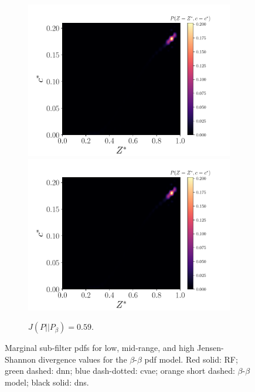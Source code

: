 \documentclass[review]{elsarticle}
\begin{document}
\begin{figure}[!tbp]
\begin{subfigure}[t]{0.32\textwidth}
    \includegraphics[page=3,width=\textwidth]{./figs/pdfs_14523.pdf}\\%
    \includegraphics[page=4,width=\textwidth]{./figs/pdfs_14523.pdf}%
    \caption{$J(P||P_{\beta})=0.59$.}\label{fig:}%
  \end{subfigure}%
  \caption{Marginal sub-filter \glspl{pdf} for low, mid-range, and high Jensen-Shannon divergence values for the $\beta$-$\beta$ \gls{pdf} model. Red solid: RF; green dashed: \gls{dnn}; blue dash-dotted: \gls{cvae}; orange short dashed: $\beta$-$\beta$ model; black solid: \gls{dns}.}\label{fig:pdfs_hilo}%
\end{figure}%
\end{document}
